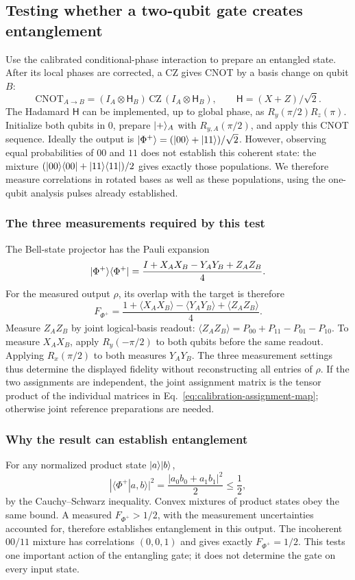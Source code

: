 \subsection{Testing whether a two-qubit gate creates entanglement}

Use the calibrated conditional-phase interaction to prepare an
entangled state. After its local phases are corrected, a CZ gives
CNOT by a basis change on qubit $B$:
\[
 \mathrm{CNOT}_{A\to B}
 =(I_A\otimes\mathsf H_B)\,\mathrm{CZ}\,
                   (I_A\otimes\mathsf H_B),
 \qquad \mathsf H=(X+Z)/\sqrt2.
\]
The Hadamard $\mathsf H$ can be implemented, up to global phase,
as $R_y(\pi/2)R_z(\pi)$. Initialize both qubits in 0, prepare
$\lvert +\rangle_A$ with $R_{y,A}(\pi/2)$, and apply this CNOT sequence.
Ideally the output is
$\lvert \Phi^+\rangle=(\lvert 00\rangle+\lvert 11\rangle)/\sqrt2$.
However, observing equal probabilities of $00$ and $11$ does not
establish this coherent state: the mixture
$(\lvert 00\rangle\langle 00\rvert+\lvert 11\rangle\langle 11\rvert)/2$ gives exactly those
populations. We therefore measure correlations in rotated bases as well as these
populations, using the one-qubit analysis pulses already established.

\subsubsection{The three measurements required by this test}
The Bell-state projector has the Pauli expansion
\[
 \lvert \Phi^+\rangle\langle \Phi^+\rvert
 =\frac{I+X_AX_B-Y_AY_B+Z_AZ_B}{4}.
\]
For the measured output $\rho$, its overlap with the target is
therefore
\begin{equation}
 F_{\Phi^+}
 =\frac{1+\langle X_AX_B\rangle-\langle Y_AY_B\rangle
                    +\langle Z_AZ_B\rangle}{4}.
 \label{eq:calibration-bell-test}
\end{equation}
Measure $Z_AZ_B$ by joint logical-basis readout:
$\langle Z_AZ_B\rangle=P_{00}+P_{11}-P_{01}-P_{10}$.
To measure $X_AX_B$, apply $R_y(-\pi/2)$ to both qubits before
the same readout. Applying $R_x(\pi/2)$ to both measures
$Y_AY_B$. The three measurement settings thus determine the
displayed fidelity without reconstructing all entries of $\rho$.
If the two assignments are independent, the joint assignment
matrix is the tensor product of the individual matrices in
Eq.~\eqref{eq:calibration-assignment-map}; otherwise joint
reference preparations are needed.

\subsubsection{Why the result can establish entanglement}
For any normalized product state $\lvert a\rangle\lvert b\rangle$,
\[
 |\langle\Phi^+|a,b\rangle|^2
 =\frac{|a_0b_0+a_1b_1|^2}{2}\le\frac12,
\]
by the Cauchy--Schwarz inequality. Convex mixtures of product
states obey the same bound. A measured
$F_{\Phi^+}>1/2$, with the measurement uncertainties accounted
for, therefore establishes entanglement in this output.
The incoherent $00/11$ mixture has correlations $(0,0,1)$
and gives exactly $F_{\Phi^+}=1/2$.
This tests one important action of the entangling gate; it does
not determine the gate on every input state.


